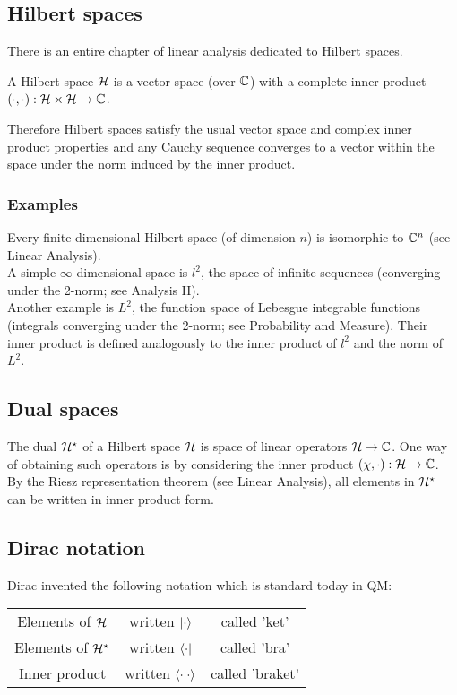 \subsection{Hilbert spaces}
\begin{remark}
	There is an entire chapter of linear analysis dedicated to Hilbert spaces.
\end{remark}

\begin{definition}
	A Hilbert space $\mathcal{H}$ is a vector space (over $\mathbb{C}$) with a complete inner product $(\cdot,\cdot) : \mathcal{H} \times \mathcal{H} \rightarrow \mathbb{C}$.
\end{definition}
Therefore Hilbert spaces satisfy the usual vector space and complex inner product properties and any Cauchy sequence converges to a vector within the space under the norm induced by the inner product.
\subsubsection{Examples}
Every finite dimensional Hilbert space (of dimension $n$) is isomorphic to $\mathbb{C}^n$ (see Linear Analysis).\\
A simple $\infty$-dimensional space is $l^2$, the space of infinite sequences (converging under the 2-norm; see Analysis II).\\
Another example is $L^2$, the function space of Lebesgue integrable functions (integrals converging under the 2-norm; see Probability and Measure). Their inner product is defined analogously to the inner product of $l^2$ and the norm of $L^2$.
\subsection{Dual spaces}
The dual $\mathcal{H}^\star$ of a Hilbert space $\mathcal{H}$ is space of linear operators $\mathcal{H} \rightarrow \mathbb{C}$. One way of obtaining such operators is by considering the inner product $(\chi,\cdot) : \mathcal{H} \rightarrow \mathbb{C}$.\\
By the Riesz representation theorem (see Linear Analysis), all elements in $\mathcal{H}^\star$ can be written in inner product form.
\subsection{Dirac notation}
Dirac invented the following notation which is standard today in QM:\\
\begin{tabular}{ccc}
	Elements of $\mathcal{H}$ & written $\ket{\cdot}$ & called 'ket'\\
	Elements of $\mathcal{H}^\star$ & written $\bra{\cdot}$ & called 'bra'\\
	Inner product & written $\bra{\cdot}\ket{\cdot}$ & called 'braket'\\
\end{tabular}

